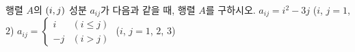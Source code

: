 행렬 $A$의 $(i{,}\mkern3mu\mathopen{}j)$ 성분 $a_{ij}$가 다음과 같을 때, 행렬 $A$를 구하시오.
 $a_{ij}=i^2-3j$ ($i$, $j=1$, $2$)
 $a_{ij}=\begin{cases} i & (i\le j) \\ -j & (i>j) \end{cases}$ ($i$, $j=1$, $2$, $3$)
